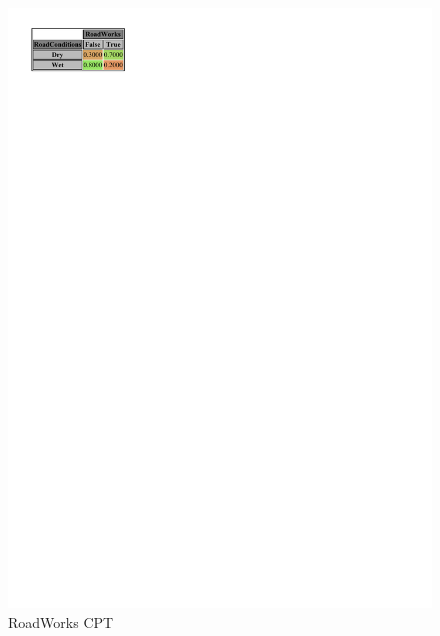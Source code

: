 \documentclass[a4paper,12pt]{article} %
\begin{document}
\begin{figure}[H]
\begin{center}
\begin{minipage}[c]{.35\textwidth}
		\includegraphics[width=.9\linewidth]{../code/roadworks.pdf}	
		\caption*{RoadWorks CPT}
		\label{fig:roadworks}
	\end{minipage}
	\end{center}
\end{figure}
\end{document}
